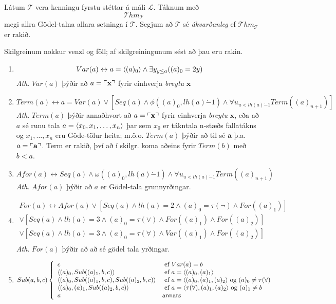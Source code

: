 \documentclass[12pt]{book}
\newcommand{\cT}{\mathcal{T}}
\newcommand{\cL}{\mathcal{L}}
\newcommand{\mc}[1]{\mathcal{#1}}
\newcommand{\ba}{\mathbf{a}}
\newcommand{\bx}{\mathbf{x}}
\newcommand{\xxn}{x_1, \dotsc, x_n}
\newcommand{\dda}{\dot{-}}
\newcommand{\Thm}{{\mc{T}hm}}
\DeclarePairedDelimiter{\god}{\ulcorner}{\urcorner}
\begin{document}
\begin{skgr}
 
  Látum $\cT$ vera kenningu fyrstu stéttar á máli $\cL$. Táknum með
 \[\Thm_{\cT}\]
 megi allra Gödel-talna allara setninga í $\cT$.
 Segjum að $\cT$ sé \emph{ákvarðanleg} ef $\Thm_{\cT}$
 er rakið.
\end{skgr}

Skilgreinum nokkur venzl og föll; af skilgreiningunum sést
að þau eru rakin.
\begin{enumerate}[(1)]
\item \[Var(a) \leftrightarrow a = \langle(a)_0\rangle \wedge \exists y_{y \leq a} ((a)_0 = 2y)\]
  \emph{Ath}. $Var(a)$ þýðir að $a = \god{\bx}$ fyrir einhverja
  \emph{breytu} $\bx$
\item \[Term(a) \leftrightarrow a = Var(a) \vee [Seq(a) \wedge \phi((a)_0, lh(a) \dda 1) \wedge \forall u_{u < lh(a) \dda 1} Term((a)_{n+1}) ]\]
  \emph{Ath}. $Term(a)$ þýðir annaðhvort að  $a = \god{\bx}$ fyrir einhverja
  \emph{breytu} $\bx$, eða að $a$ sé runu tala $a = \braket{x_0, \xxn}$
  þar sem $x_0$ er tákntala n-stæðs fallatákns og $\xxn$ eru Göde-tölur heita;
  m.ö.o. $Term(a)$ þýðir að til sé $\ba$ þ.a. $a = \god{\ba}$. Term er rakið,
  því að í skilgr. koma aðeins fyrir $Term(b)$ með $b<a$.
\item  \[Afor(a) \leftrightarrow Seq(a) \wedge \omega((a)_0, lh(a) \dda 1) \wedge \forall u_{u < lh(a) \dda 1} Term((a)_{n+1}) \]
  \emph{Ath}. $Afor(a)$ þýðir að $a$ er Gödel-tala grunnyrðingar.

\item 
  \begin{gather*}
    For(a) \leftrightarrow Afor(a) \vee [Seq(a) \wedge lh(a) = 2 \wedge (a)_0 = \tau(\lnot) \wedge For((a)_1) ]\\
    \vee [Seq(a) \wedge lh(a) = 3 \wedge (a)_0 = \tau(\vee) \wedge For((a)_1) \wedge For((a)_2) ]\\
    \vee [Seq(a) \wedge lh(a) = 3 \wedge (a)_0 = \tau(\forall) \wedge Var((a)_1) \wedge For((a)_2) ]\\
  \end{gather*}
  \emph{Ath}. $For(a)$ þýðir að að sé gödel tala yrðingar.
\item 

\[ Sub(a,b,c) \left\{ \begin{array}{l l}
c & \text{ ef } Var(a) = b\\
\langle(a)_0, Sub((a)_1,b,c)\rangle & \text{ ef } a = \langle(a)_0,(a)_1\rangle\\
\langle(a)_0, Sub((a)_1,b,c),Sub((a)_2,b,c)\rangle & \text{ ef } a = \langle(a)_0,(a)_1,(a)_2\rangle \text{ og } (a)_0 \neq \tau(\forall)\\
\langle(a)_0,(a)_1,Sub((a)_2,b,c)\rangle & \text{ ef } a = \langle\tau(\forall),(a)_1,(a)_2\rangle \text{ og } (a)_1 \neq b\\
a & \text{annars}
 \end{array} \right. \]


\end{enumerate}
\end{document}
